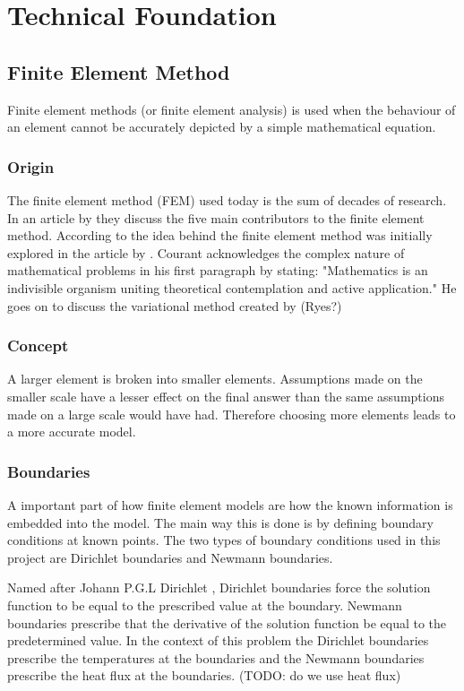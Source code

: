 \chapter{Technical Foundation} \label{tech}
\section{Finite Element Method}\label{femsec}
Finite element methods (or finite element analysis) is used when the behaviour of an element cannot be accurately depicted by a simple mathematical equation. 
	\subsection{Origin}
	The finite element method (FEM) used today is the sum of decades of research. 
	In an article by \citeauthor{Gupta:1996} they discuss the five main contributors to the finite element method. 
	According to \citet{Gupta:1996} the idea behind the finite element method was initially explored in the \citeyear{Courant:1943} article by \citeauthor{Courant:1943}. 
	Courant acknowledges the complex nature of mathematical problems in his first paragraph by stating: "Mathematics is an indivisible organism uniting theoretical contemplation and active application."
	He goes on to discuss the variational method created by (Ryes?)
	
	
	
	\subsection{Concept}
	A larger element is broken into smaller elements. 
	Assumptions made on the smaller scale have a lesser effect on the final answer than the same assumptions made on a large scale would have had.
	Therefore choosing more elements leads to a more accurate model.
	
	\subsection{Boundaries}
	A important part of how finite element models are how the known information is embedded into the model.
	The main way this is done is by defining boundary conditions at known points. The two types of boundary conditions used in this project are Dirichlet boundaries and Newmann boundaries.
	
	Named after Johann P.G.L Dirichlet \citep{Cheng:2005} , Dirichlet boundaries force the solution function to be equal to the prescribed value at the boundary. Newmann boundaries prescribe that the derivative of the solution function be equal to the predetermined value. In the context of this problem the Dirichlet boundaries prescribe the temperatures at the boundaries and the Newmann boundaries prescribe the heat flux at the boundaries. (TODO: do we use heat flux)
	


